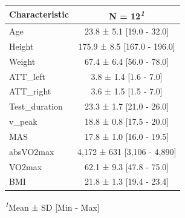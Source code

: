 \begin{table}
\fontsize{9.0pt}{10.8pt}\selectfont
\begin{tabular*}{\linewidth}{@{\extracolsep{\fill}}lc}
\toprule
\textbf{Characteristic} & \textbf{N = 12}\textsuperscript{\textit{1}} \\ 
\midrule\addlinespace[2.5pt]
Age & 23.8 ± 5.1 [19.0 - 32.0] \\ 
Height & 175.9 ± 8.5 [167.0 - 196.0] \\ 
Weight & 67.4 ± 6.4 [56.0 - 78.0] \\ 
ATT\_left & 3.8 ± 1.4 [1.6 - 7.0] \\ 
ATT\_right & 3.6 ± 1.5 [1.5 - 7.0] \\ 
Test\_duration & 23.3 ± 1.7 [21.0 - 26.0] \\ 
v\_peak & 18.8 ± 0.8 [17.5 - 20.0] \\ 
MAS & 17.8 ± 1.0 [16.0 - 19.5] \\ 
absVO2max & 4,172 ± 631 [3,106 - 4,890] \\ 
VO2max & 62.1 ± 9.3 [47.8 - 75.0] \\ 
BMI & 21.8 ± 1.3 [19.4 - 23.4] \\ 
\bottomrule
\end{tabular*}
\begin{minipage}{\linewidth}
\textsuperscript{\textit{1}}Mean ± SD {[}Min - Max{]}\\
\end{minipage}
\end{table}

